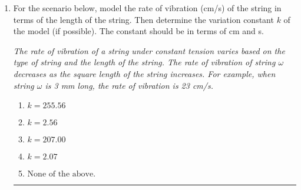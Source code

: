 \documentclass[14pt]{extbook}
\newcommand{\litem}[1]{\item#1\hspace*{-1cm}\rule{\textwidth}{0.4pt}}
\begin{document}
\begin{enumerate}
{\begin{enumerate}[label=\Alph*.]
\end{enumerate} }
\litem{
For the scenario below, model the rate of vibration (cm/s) of the string in terms of the length of the string. Then determine the variation constant $k$ of the model (if possible). The constant should be in terms of cm and s.
\begin{center}
    \textit{ The rate of vibration of a string under constant tension varies based on the type of string and the length of the string. The rate of vibration of string $\omega$ decreases as the square length of the string increases. For example, when string $\omega$ is 3 mm long, the rate of vibration is 23 cm/s. }
\end{center}
\begin{enumerate}[label=\Alph*.]
\item \( k = 255.56 \)
\item \( k = 2.56 \)
\item \( k = 207.00 \)
\item \( k = 2.07 \)
\item \( \text{None of the above.} \)

\end{enumerate} }
\end{enumerate}
\end{document}
